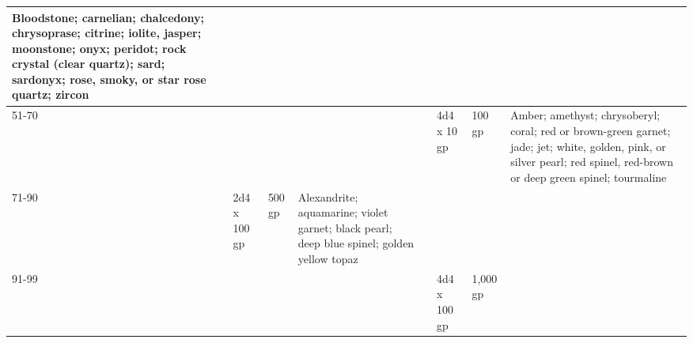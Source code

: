 \begin{longtable}{llllllll}
{\begin{minipage}[t]{0.450in}
Bloodstone; carnelian; chalcedony; chrysoprase; citrine; iolite, jasper; moonstone; 
onyx; peridot; rock crystal (clear quartz); sard; sardonyx; rose, smoky, or star 
rose quartz; zircon\end{minipage}}\\
\hline
\multicolumn{5}{p{3.031in}|}{\begin{minipage}[t]{3.031in}\raggedright
51-70\end{minipage}} & \multicolumn{1}{p{0.043in}|}{\begin{minipage}[t]{0.043in}\raggedright
4d4 x 10 gp\end{minipage}} & \multicolumn{1}{p{0.043in}|}{\begin{minipage}[t]{0.043in}\raggedright
100 gp\end{minipage}} & \multicolumn{1}{p{0.043in}|}{\begin{minipage}[t]{0.043in}\raggedright
Amber; amethyst; chrysoberyl; coral; red or brown-green garnet; jade; jet; white, 
golden, pink, or silver pearl; red spinel, red-brown or deep green spinel; tourmaline\end{minipage}}\\
\hline
\multicolumn{1}{p{0.043in}|}{\begin{minipage}[t]{0.043in}\raggedright
71-90\end{minipage}} & \multicolumn{1}{|p{0.359in}|}{\begin{minipage}[t]{0.359in}\raggedright
2d4 x 100 gp\end{minipage}} & \multicolumn{1}{p{0.661in}|}{\begin{minipage}[t]{0.661in}\raggedright
500 gp\end{minipage}} & \multicolumn{1}{p{0.450in}|}{\begin{minipage}[t]{0.450in}\raggedright
Alexandrite; aquamarine; violet garnet; black pearl; deep blue spinel; golden yellow 
topaz\end{minipage}}\\
\hline
\multicolumn{5}{p{3.031in}|}{\begin{minipage}[t]{3.031in}\raggedright
91-99\end{minipage}} & \multicolumn{1}{|p{0.359in}|}{\begin{minipage}[t]{0.359in}\raggedright
4d4 x 100 gp\end{minipage}} & \multicolumn{1}{p{0.661in}|}{\begin{minipage}[t]{0.661in}\raggedright
1,000 gp\end{minipage}} & \multicolumn{1}{p{0.450in}|}{\begin{minipage}[t]{0.450in}\raggedright

\end{minipage}}
\end{longtable}
